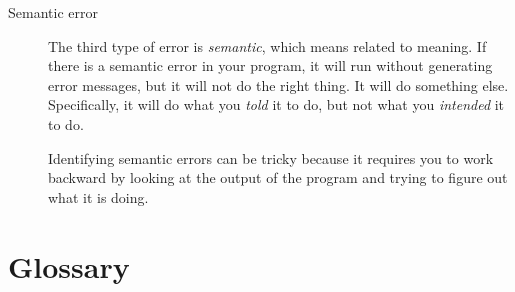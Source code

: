 \begin{description}
\item[Semantic error] The third type of error is \emph{semantic}, which
  means related to meaning.  If there is a semantic error in your
  program, it will run without generating error messages, but it will
  not do the right thing.  It will do something else.  Specifically,
  it will do what you \emph{told} it to do, but not what you 
  \emph{intended} it to do.
   

Identifying semantic errors can be tricky because it requires you to work
backward by looking at the output of the program and trying to figure
out what it is doing.

\end{description}


\section{Glossary}

